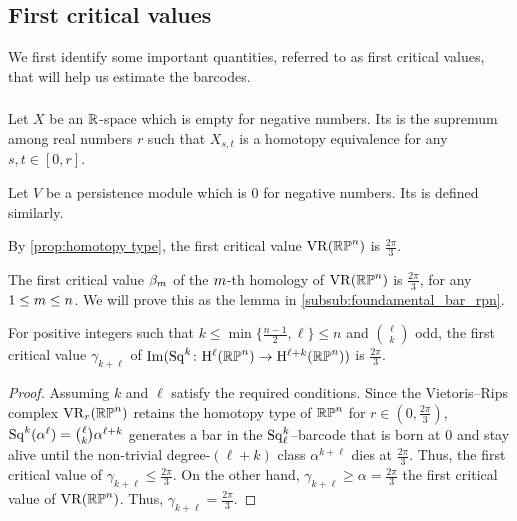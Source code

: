 \subsection{First critical values}

We first identify some important quantities, referred to as first critical values, that will help us estimate the barcodes.

\subsubsection{}
\label{subsub:first_critical_value}

 Let $X$ be an $\mathbb{R}$-space which is empty for negative numbers.
Its  is the supremum among real numbers $r$ such that $X_{s,t}$ is a homotopy equivalence for any $s,t \in [0,r]$. 

Let $V$ be a persistence module which is $0$ for negative numbers.
Its  is defined similarly. 

\medskip\example
By \cref{prop:homotopy type}, the first critical value $\operatorname{VR}(\mathbb{RP}^n)$ is $\tfrac{2\pi}{3}$.

The first critical value $\beta_m$ of the $m$-th homology of $\operatorname{VR}(\mathbb{RP}^n)$ is $\tfrac{2\pi}{3}$, for any $1 \leq m \leq n$. We will prove this as the lemma in \cref{subsub:foundamental_bar_rpn}.
    

\medskip\lemma
For positive integers such that $k \leq \min\{\frac{n-1}{2}, \ell\} \leq n$ and $\binom{\ell}{k}$ odd,
the first critical value $\gamma_{k+\ell}$ of $\operatorname{Im} (\operatorname{Sq}^k \colon \mathrm{H}^\ell(\mathbb{RP}^n) \to \mathrm{H}^{\ell+k}(\mathbb{RP}^n))$ is $\tfrac{2\pi}{3}$.

\begin{proof}
	Assuming $k$ and $\ell$ satisfy the required conditions.
	Since the Vietoris--Rips complex $\operatorname{VR}_r(\mathbb{RP}^n)$ retains the homotopy type of $\mathbb{RP}^n$ for $r \in (0,\tfrac{2\pi}{3})$, $\operatorname{Sq}^k(\alpha^\ell) = \binom{\ell}{k}\alpha^{\ell+k}$ generates a bar in the $\operatorname{Sq}^k_\ell$--barcode that is born at $0$ and stay alive until the non-trivial degree-$(\ell+k)$ class $\alpha^{k+\ell}$ dies at $\tfrac{2\pi}{3}$.
        Thus, the first critical value of $\gamma_{k+\ell} \leq \tfrac{2\pi}{3}$.
        On the other hand, $\gamma_{k+\ell} \geq \alpha = \tfrac{2\pi}{3}$ the first critical value of $\operatorname{VR}(\mathbb{RP}^n)$.
        Thus, $\gamma_{k+\ell} = \tfrac{2\pi}{3}$.
\end{proof}


